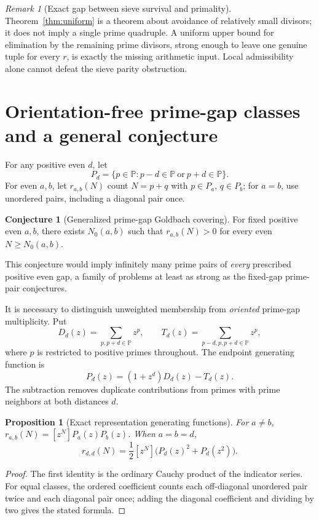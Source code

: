 \documentclass[11pt,a4paper]{article}
\newtheorem{proposition}[theorem]{Proposition}
\theoremstyle{definition}
\newtheorem{conjecture}[theorem]{Conjecture}
\theoremstyle{remark}
\newtheorem{remark}[theorem]{Remark}
\newcommand{\PP}{\mathbb P}
\begin{document}
\begin{remark}[Exact gap between sieve survival and primality]
Theorem~\ref{thm:uniform} is a theorem about avoidance of relatively small divisors; it does not imply a single prime quadruple.  A uniform upper bound for elimination by the remaining prime divisors, strong enough to leave one genuine tuple for every $r$, is exactly the missing arithmetic input.  Local admissibility alone cannot defeat the sieve parity obstruction.
\end{remark}

\section{Orientation-free prime-gap classes and a general conjecture}
For any positive even $d$, let
\begin{equation}
 P_d=\{p\in\PP:p-d\in\PP\ \text{or}\ p+d\in\PP\}.
\end{equation}
For even $a,b$, let $r_{a,b}(N)$ count $N=p+q$ with $p\in P_a$, $q\in P_b$; for $a=b$, use unordered pairs, including a diagonal pair once.

\begin{conjecture}[Generalized prime-gap Goldbach covering]\label{conj:exist}
For fixed positive even $a,b$, there exists $N_0(a,b)$ such that $r_{a,b}(N)>0$ for every even $N\ge N_0(a,b)$.
\end{conjecture}
This conjecture would imply infinitely many prime pairs of \emph{every} prescribed positive even gap, a family of problems at least as strong as the fixed-gap prime-pair conjectures.

It is necessary to distinguish unweighted membership from \emph{oriented} prime-gap multiplicity. Put
\begin{equation}
 D_d(z)=\sum_{p,p+d\in\PP}z^p,\qquad
 T_d(z)=\sum_{p-d,p,p+d\in\PP}z^p,
\end{equation}
where $p$ is restricted to positive primes throughout.  The endpoint generating function is
\begin{equation}\label{eq:Ppoly}
 \boxed{\displaystyle P_d(z)=(1+z^d)D_d(z)-T_d(z).}
\end{equation}
The subtraction removes duplicate contributions from primes with prime neighbors at both distances $d$.

\begin{proposition}[Exact representation generating functions]
For $a\ne b$, $r_{a,b}(N)=[z^N]P_a(z)P_b(z)$.  When $a=b=d$,
\begin{equation}
 r_{d,d}(N)=\frac12[z^N]\bigl(P_d(z)^2+P_d(z^2)\bigr).
\end{equation}
\end{proposition}
\begin{proof}
The first identity is the ordinary Cauchy product of the indicator series.  For equal classes, the ordered coefficient counts each off-diagonal unordered pair twice and each diagonal pair once; adding the diagonal coefficient and dividing by two gives the stated formula.
\end{proof}
\end{document}
